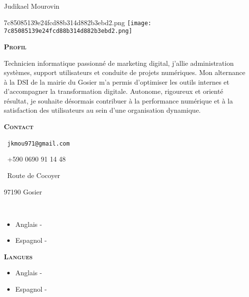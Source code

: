 \documentclass[11pt,a4paper]{article}
\newcommand{\headleft}[1]{\vspace*{3ex}\textsc{\textbf{#1}}\par%
  \vspace*{-1.5ex}\hrulefill\par\vspace*{0.7ex}}
\begin{document}
\thispagestyle{empty}
\setlength{\topskip}{0pt}\setlength{\parindent}{0pt}\setlength{\parskip}{0pt}
\raggedbottom

\begin{minipage}[t]{0.33\textwidth}
  \colorbox{cvblue}{\begin{minipage}[t][5mm][t]{\textwidth}\null\end{minipage}}
  \vspace{-.2ex}
  \colorbox{cvblue!90}{%
    \color{white}\textwidth
    \begin{minipage}[t][293mm][t]{0.82\textwidth}\raggedright
      \vspace*{2.5ex}
      \Large Judikael Mourovin\normalsize

      \ifx\relax7c85085139e24fcd88b314d882b3ebd2.png\relax\else
        \vspace{2ex}\null\hfill
        \texttt{[image: 7c85085139e24fcd88b314d882b3ebd2.png]}
        \hfill\null
      \fi

      \headleft{Profil}
      \begingroup           %
       \justifying         %
        Technicien informatique passionné de marketing digital, j’allie administration systèmes, support utilisateurs et conduite de projets numériques. Mon alternance à la DSI de la mairie du Gosier m’a permis d’optimiser les outils internes et d’accompagner la transformation digitale. Autonome, rigoureux et orienté résultat, je souhaite désormais contribuer à la performance numérique et à la satisfaction des utilisateurs au sein d’une organisation dynamique.
      \endgroup             %

      \headleft{Contact}\small
      \MVAt\  \texttt{jkmou971@gmail.com}\par
      \Mobilefone\ +590 0690 91 14 48\par
      \Letter\ Route de Cocoyer\par
      97190 Gosier\par
      \faLinkedin\  \href{}{}
      \normalsize

      \ifx\relax\begin{itemize}[leftmargin=*]
\item Anglais - \textcolor{gray}{}
\item Espagnol - \textcolor{gray}{}\end{itemize}\relax\else
        \headleft{Langues}
        \begin{itemize}[leftmargin=*]
\item Anglais - \textcolor{gray}{}
\item Espagnol - \textcolor{gray}{}\end{itemize}
      \fi


\end{minipage}}
\end{minipage}
\end{document}
